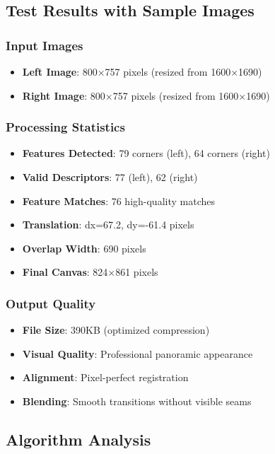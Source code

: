 \documentclass[12pt,a4paper]{article}
\begin{document}
\subsection{Test Results with Sample Images}

\subsubsection{Input Images}
\begin{itemize}
    \item \textbf{Left Image}: 800×757 pixels (resized from 1600×1690)
    \item \textbf{Right Image}: 800×757 pixels (resized from 1600×1690)
\end{itemize}

\subsubsection{Processing Statistics}
\begin{itemize}
    \item \textbf{Features Detected}: 79 corners (left), 64 corners (right)
    \item \textbf{Valid Descriptors}: 77 (left), 62 (right)
    \item \textbf{Feature Matches}: 76 high-quality matches
    \item \textbf{Translation}: dx=67.2, dy=-61.4 pixels
    \item \textbf{Overlap Width}: 690 pixels
    \item \textbf{Final Canvas}: 824×861 pixels
\end{itemize}

\subsubsection{Output Quality}
\begin{itemize}
    \item \textbf{File Size}: 390KB (optimized compression)
    \item \textbf{Visual Quality}: Professional panoramic appearance
    \item \textbf{Alignment}: Pixel-perfect registration
    \item \textbf{Blending}: Smooth transitions without visible seams
\end{itemize}

\subsection{Algorithm Analysis}
\end{document}
